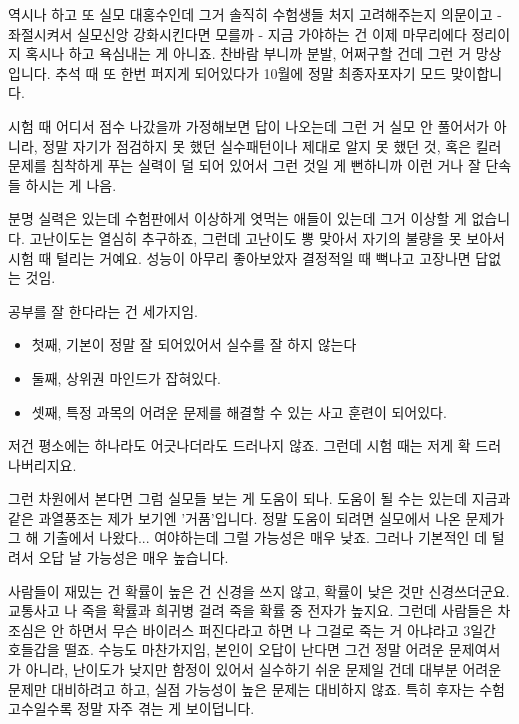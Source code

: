 역시나 하고 또 실모 대홍수인데 그거 솔직히 수험생들 처지 고려해주는지 의문이고 - 좌절시켜서 실모신앙 강화시킨다면 모를까 -
지금 가야하는 건 이제 마무리에다 정리이지 혹시나 하고 욕심내는 게 아니죠.
찬바람 부니까 분발, 어쩌구할 건데 그런 거 망상입니다. 추석 때 또 한번 퍼지게 되어있다가 10월에 정말 최종자포자기 모드 맞이합니다.
\vspace{5mm}

시험 때 어디서 점수 나갔을까 가정해보면 답이 나오는데
그런 거 실모 안 풀어서가 아니라, 정말 자기가 점검하지 못 했던 실수패턴이나 제대로 알지 못 했던 것,
혹은 킬러문제를 침착하게 푸는 실력이 덜 되어 있어서 그런 것일 게 뻔하니까 이런 거나 잘 단속들 하시는 게 나음.
\vspace{5mm}

분명 실력은 있는데 수험판에서 이상하게 엿먹는 애들이 있는데 그거 이상할 게 없습니다.
고난이도는 열심히 추구하죠, 그런데 고난이도 뽕 맞아서 자기의 불량을 못 보아서 시험 때 털리는 거예요.
성능이 아무리 좋아보았자 결정적일 때 뻑나고 고장나면 답없는 것임.
\vspace{5mm}

공부를 잘 한다라는 건 세가지임.
\begin{itemize}
    \item 첫째, 기본이 정말 잘 되어있어서 실수를 잘 하지 않는다
    \item 둘째, 상위권 마인드가 잡혀있다.
    \item 셋째, 특정 과목의 어려운 문제를 해결할 수 있는 사고 훈련이 되어있다.
\end{itemize}
\vspace{5mm}

저건 평소에는 하나라도 어긋나더라도 드러나지 않죠. 그런데 시험 때는 저게 확 드러나버리지요.
\vspace{5mm}

그런 차원에서 본다면 그럼 실모들 보는 게 도움이 되나.
도움이 될 수는 있는데 지금과 같은 과열풍조는 제가 보기엔 '거품'입니다.
정말 도움이 되려면 실모에서 나온 문제가 그 해 기출에서 나왔다... 여야하는데 그럴 가능성은 매우 낮죠.
그러나 기본적인 데 털려서 오답 날 가능성은 매우 높습니다.
\vspace{5mm}

사람들이 재밌는 건 확률이 높은 건 신경을 쓰지 않고, 확률이 낮은 것만 신경쓰더군요.
교통사고 나 죽을 확률과 희귀병 걸려 죽을 확률 중 전자가 높지요.
그런데 사람들은 차조심은 안 하면서 무슨 바이러스 퍼진다라고 하면 나 그걸로 죽는 거 아냐라고 3일간 호들갑을 떨죠.
수능도 마찬가지임,
본인이 오답이 난다면 그건 정말 어려운 문제여서가 아니라, 난이도가 낮지만 함정이 있어서 실수하기 쉬운 문제일 건데
대부분 어려운 문제만 대비하려고 하고, 실점 가능성이 높은 문제는 대비하지 않죠.
특히 후자는 수험고수일수록 정말 자주 겪는 게 보이덥니다.
\vspace{5mm}

